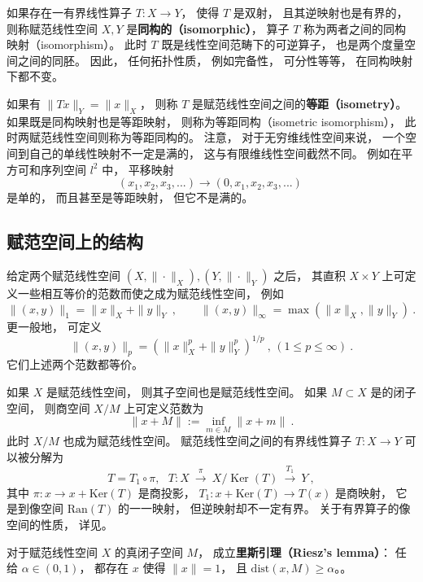 如果存在一有界线性算子 $T:X\to Y$， 使得 $T$ 是双射， 且其逆映射也是有界的， 则称赋范线性空间 $X,Y$ 是\textbf{同构的（isomorphic）}， 算子 $T$ 称为两者之间的同构映射（isomorphism）。 此时 $T$ 既是线性空间范畴下的可逆算子， 也是两个度量空间之间的同胚。 因此， 任何拓扑性质， 例如完备性， 可分性等等， 在同构映射下都不变。 

如果有 $\|Tx\|_Y=\|x\|_X$， 则称 $T$ 是赋范线性空间之间的\textbf{等距（isometry）}。 如果既是同构映射也是等距映射， 则称为等距同构（isometric isomorphism）， 此时两赋范线性空间则称为等距同构的。 注意， 对于无穷维线性空间来说， 一个空间到自己的单线性映射不一定是满的， 这与有限维线性空间截然不同。 例如在平方可和序列空间 $l^2$ 中， 平移映射
$$
(x_1,x_2,x_3,...)\to(0,x_1,x_2,x_3,...)~
$$
是单的， 而且甚至是等距映射， 但它不是满的。

\subsection{赋范空间上的结构}
给定两个赋范线性空间 $(X,\|\cdot\|_X),(Y,\|\cdot\|_Y)$ 之后， 其直积 $X\times Y$ 上可定义一些相互等价的范数而使之成为赋范线性空间， 例如
$$
\|(x,y)\|_{1}=\|x\|_X+\|y\|_Y~,\qquad \|(x,y)\|_{\infty }=\max(\|x\|_X,\|y\|_Y)~.
$$
更一般地， 可定义
$$
\|(x,y)\|_{p}=\left(\|x\|_X^p+\|y\|_Y^p\right)^{1/p}~,\,(1\leq p\leq\infty)~.
$$
它们上述两个范数都等价。

如果 $X$ 是赋范线性空间， 则其子空间也是赋范线性空间。 如果 $M\subset X$ 是的闭子空间， 则商空间 $X/M$ 上可定义范数为
$$
\|x+M\|:=\inf \limits _{m\in M}\|x+m\|~.
$$
此时 $X/M$ 也成为赋范线性空间。 赋范线性空间之间的有界线性算子 $T:X\to Y$ 可以被分解为
$$
T=T_{1}\circ \pi ,\ \ \ T:X\ {\overset {\pi }{\longrightarrow }}\ X/\operatorname {Ker} (T)\ {\overset {T_{1}}{\longrightarrow }}\ Y~,
$$
其中 $\pi:x\to x+\text{Ker}(T)$ 是商投影， $T_1:x+\text{Ker}(T)\to T(x)$ 是商映射， 它是到像空间 $\text{Ran}(T)$ 的一一映射， 但逆映射却不一定有界。 关于有界算子的像空间的性质， 详见。 %

对于赋范线性空间 $X$ 的真闭子空间 $M$， 成立\textbf{里斯引理（Riesz's lemma）}： 任给 $\alpha\in(0,1)$， 都存在 $x$ 使得 $\|x\|=1$， 且 $\text{dist}(x,M)\geq\alpha$。。
